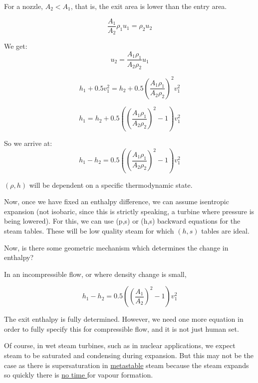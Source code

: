 \documentclass[masters]{ucbthesis}
\renewcommand{\_}{\kern-1.5pt\textunderscore\kern-1.5pt}
\begin{document}
For a nozzle, $A_2 < A_1$, that is, the exit area is lower 
than the entry area.

\begin{equation*}
	 \frac{A_1}{A_2} \rho_1 u_1 = \rho_2 u_2
\end{equation*}

We get:
\begin{equation*}
	 u_2 = \frac{A_1 \rho_1}{A_2 \rho_2} u_1 
\end{equation*}


\begin{equation*}
	h_1 + 0.5 v^2_1 = 
	h_2 + 0.5 \left( \frac{A_1 \rho_1}{A_2 \rho_2}\right)^2 v_1^2 
\end{equation*}

\begin{equation*}
	h_1  = h_2 
	+ 0.5 \left( 
		\left(\frac{A_1 \rho_1}{A_2 \rho_2} \right)^2
		- 1 
	\right) v_1^2 
\end{equation*}


So we arrive at:
\begin{equation*}
	h_1 - h_2 = 
	0.5 \left( 
		\left(\frac{A_1 \rho_1}{A_2 \rho_2} \right)^2
		- 1 
	\right) v_1^2 
\end{equation*}

$(\rho,h)$ will be dependent on a specific thermodynamic state.

Now, once we have fixed an enthalpy difference, we can assume isentropic 
expansion (not isobaric, since this is strictly speaking, a turbine 
where pressure is being lowered). For this, we can use (p,s) or (h,s) 
backward equations for the steam tables. These will be low quality steam 
for which $(h,s)$ tables are ideal.

Now, is there some geometric mechanism which determines the change in 
enthalpy?

In an incompressible flow, or where density change is small,

\begin{equation*}
	h_1 - h_2 = 
	0.5 \left( 
		\left(\frac{A_1 }{A_2 } \right)^2
		- 1 
	\right) v_1^2 
\end{equation*}

The exit enthalpy is fully determined. However, we need one more equation 
in order to fully specify this for compressible flow, and it is not 
just human set. 

Of course, in wet steam turbines, such as in nuclear applications, we 
expect steam to be saturated and condensing during expansion. But this 
may not be the case as there is supersaturation in  
\href{https://sachinchaturvedi.wordpress.com/wp-content/uploads/2012/01/unit-4-flow-through-nozzles.pdf}{metastable}
steam because the steam expands so quickly there is 
\href{https://www.nitsri.ac.in/Department/Mechanical\%20Engineering/MEC_404_Steam_Nozzle_Lecture_Notes_Part_II.pdf}{no time }
for vapour formation.
\end{document}
